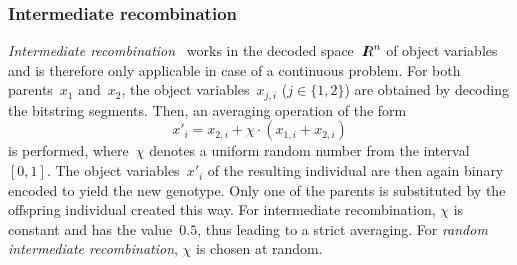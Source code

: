 \subsubsection{Intermediate recombination}

{\em Intermediate recombination\/}~\cite{Schw81} works in the decoded 
space~$\Real^n$ of object variables and is therefore only applicable 
in case of a continuous problem.
For both parents~$x_1$ and~$x_2$, the object variables~$x_{j,i}$ 
($j \in \{1,2\}$) are obtained by decoding the bitstring segments.
Then, an averaging operation of the form
%
\begin{equation}
	x'_i = x_{2,i} + \chi \cdot (x_{1,i} + x_{2,i})
\end{equation}
%
is performed, where~$\chi$ denotes a uniform random number from the 
interval~$[0,1]$.
The object variables~$x'_i$ of the resulting individual are then again 
binary encoded to yield the new genotype.
Only one of the parents is substituted by the offspring individual created 
this way.
For intermediate recombination, $\chi$ is constant and has the value~$0.5$,
thus leading to a strict averaging. 
For {\em random intermediate recombination\/}, $\chi$ is chosen at random.

